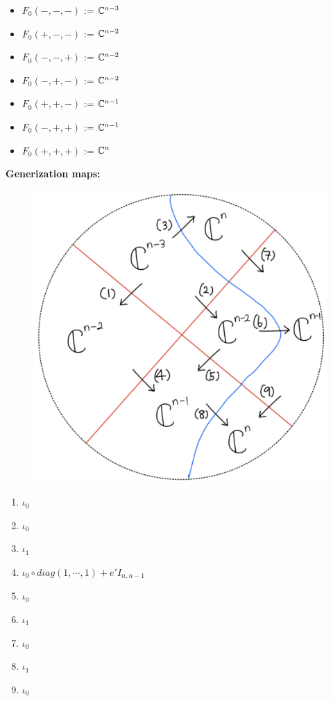 \begin{itemize}
\item $F_0(-,-,-)$ := $\mathbb{C}^{n-3}$
\item $F_0(+,-,-)$ := $\mathbb{C}^{n-2}$
\item $F_0(-,-,+)$ := $\mathbb{C}^{n-2}$
\item $F_0(-,+,-)$ := $\mathbb{C}^{n-2}$
\item $F_0(+,+,-)$ := $\mathbb{C}^{n-1}$
\item $F_0(-,+,+)$ := $\mathbb{C}^{n-1}$
\item $F_0(+,+,+)$ := $\mathbb{C}^n$
\end{itemize}
\textbf{Generization maps:}
\begin{figure}[H]
    \centering
    \includegraphics[scale = 0.95]{diagrams/cobord'4/21.png}
    \caption{}
    \label{fig:your-label}
\end{figure}
\begin{enumerate}[label = (\arabic*)]
\item $\iota_0$

\item $\iota_0$

\item $\iota_1$

\item $\iota_0 \circ diag(1,\cdots,1)+e'I_{n,n-1}$

\item $\iota_0$

\item $\iota_1$

\item $\iota_0$

\item $\iota_1$

\item $\iota_0$
\end{enumerate}

